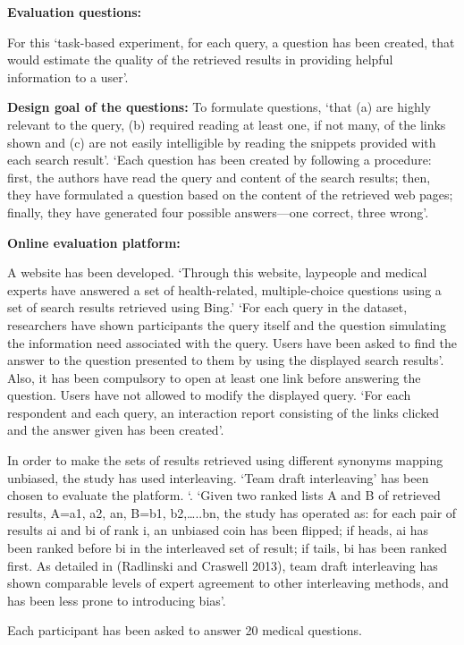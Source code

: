 \documentclass[]{article}
\begin{document}
\textbf{Evaluation questions:}

For this ‘task-based experiment, for each query, a question has been created, that would estimate the quality of the retrieved results in providing helpful information to a user’.

\textbf{Design goal of the questions:} To formulate questions, ‘that (a) are highly relevant to the query, (b) required reading at least one, if not many, of the links shown and (c) are not easily intelligible by reading the snippets provided with each search result’. ‘Each question has been created by following a procedure: first, the authors have read the query and content of the search results; then, they have formulated a question based on the content of the retrieved web pages; finally, they have generated four possible answers—one correct, three wrong’.  

\textbf{Online evaluation platform:}
 
A website has been developed. ‘Through this website, laypeople and medical experts have answered a set of health-related, multiple-choice questions using a set of search results retrieved using Bing.’ ‘For each query in the dataset, researchers have shown participants the query itself and the question simulating the information need associated with the query. Users have been asked to find the answer to the question presented to them by using the displayed search results’. Also, it has been compulsory to open at least one link before answering the question. Users have not allowed to modify the displayed query. ‘For each respondent and each query, an interaction report consisting of the links clicked and the answer given has been created’.
 
In order to make the sets of results retrieved using different synonyms mapping unbiased, the study has used interleaving. ‘Team draft interleaving’ has been chosen to evaluate the platform. ‘. ‘Given two ranked lists A and B of retrieved results, A={a1, a2, an}, B={b1, b2,…..bn}, the study has operated as: for each pair of results ai and bi of rank i, an unbiased coin has been flipped; if heads, ai has been ranked before bi in the interleaved set of result; if tails, bi has been ranked first. As detailed in (Radlinski and Craswell 2013), team draft interleaving has shown comparable levels of expert agreement to other interleaving methods, and has been less prone to introducing bias’. 

Each participant has been asked to answer 20 medical questions. 
\end{document}
